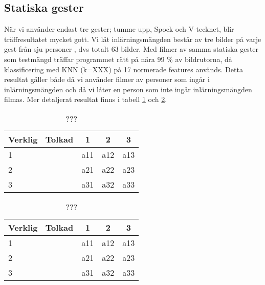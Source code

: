 \documentclass[../rapport_MVEX01-11-05]{subfiles}
\begin{document}
\subsection{Statiska gester}
När vi använder endast tre gester; tumme upp, Spock och V-tecknet,
blir träffresultatet mycket gott. Vi lät inlärningsmängden består av
tre bilder på varje gest från sju personer , dvs
totalt 63 bilder. Med filmer av samma statiska gester som
testmängd träffar programmet rätt på nära 99 \% av bildrutorna, då
klassificering med KNN (k=XXX) på 17 normerade
features används. Detta
resultat gäller både då vi använder filmer av personer som ingår i
inlärningsmängden och då vi låter en person som inte ingår
inlärningsmängden filmas. Mer detaljerat resultat finns i tabell
\ref{tab:3resInl} och \ref{tab:3resEmma}.

\begin{table}
  \centering  
  \caption{???}
  \label{tab:3resInl}
  \begin{tabular}{lccc}
    \toprule
    Verklig \ Tolkad & 1 & 2 & 3 \\
    \midrule
    1&a11&a12&a13 \\
    2&a21&a22&a23 \\
    3&a31&a32&a33 \\
    \bottomrule
  \end{tabular}
\end{table}

\begin{table}
  \centering
  \caption{???}
  \label{tab:3resEmma}
  \begin{tabular}{lccc}
    \toprule
    Verklig \ Tolkad & 1 & 2 & 3 \\
    \midrule
    1&a11&a12&a13 \\
    2&a21&a22&a23 \\
    3&a31&a32&a33 \\
    \bottomrule
  \end{tabular}
\end{table}
\end{document}
